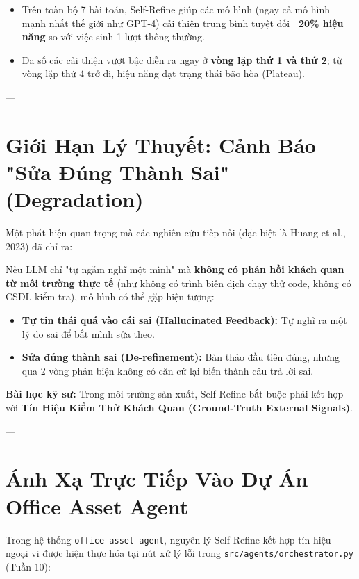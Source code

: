\documentclass[11pt,a4paper]{article}
\begin{document}
\begin{benchmarkbox}
\begin{itemize}[leftmargin=1.5em]
    \item Trên toàn bộ 7 bài toán, Self-Refine giúp các mô hình (ngay cả mô hình mạnh nhất thế giới như GPT-4) cải thiện trung bình tuyệt đối \textbf{~20\% hiệu năng} so với việc sinh 1 lượt thông thường.
    \item Đa số các cải thiện vượt bậc diễn ra ngay ở \textbf{vòng lặp thứ 1 và thứ 2}; từ vòng lặp thứ 4 trở đi, hiệu năng đạt trạng thái bão hòa (Plateau).
\end{itemize}
\end{benchmarkbox}

---

\section{Giới Hạn Lý Thuyết: Cảnh Báo "Sửa Đúng Thành Sai" (Degradation)}

Một phát hiện quan trọng mà các nghiên cứu tiếp nối (đặc biệt là Huang et al., 2023) đã chỉ ra:
\begin{coreconceptbox}
Nếu LLM chỉ "tự ngẫm nghĩ một mình" mà \textbf{không có phản hồi khách quan từ môi trường thực tế} (như không có trình biên dịch chạy thử code, không có CSDL kiểm tra), mô hình có thể gặp hiện tượng:
\begin{itemize}[leftmargin=1.5em]
    \item \textbf{Tự tin thái quá vào cái sai (Hallucinated Feedback):} Tự nghĩ ra một lý do sai để bắt mình sửa theo.
    \item \textbf{Sửa đúng thành sai (De-refinement):} Bản thảo đầu tiên đúng, nhưng qua 2 vòng phản biện không có căn cứ lại biến thành câu trả lời sai.
\end{itemize}
\textbf{Bài học kỹ sư:} Trong môi trường sản xuất, Self-Refine bắt buộc phải kết hợp với \textbf{Tín Hiệu Kiểm Thử Khách Quan (Ground-Truth External Signals)}.
\end{coreconceptbox}

---

\section{Ánh Xạ Trực Tiếp Vào Dự Án Office Asset Agent}

Trong hệ thống \texttt{office-asset-agent}, nguyên lý Self-Refine kết hợp tín hiệu ngoại vi được hiện thực hóa tại nút xử lý lỗi trong \texttt{src/agents/orchestrator.py} (Tuần 10):
\end{document}

